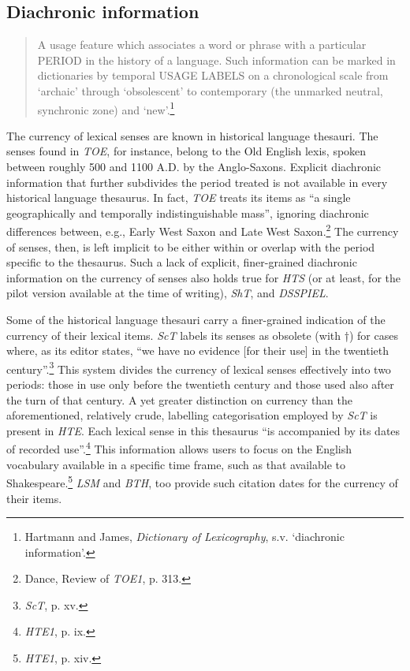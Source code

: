 \subsection*{Diachronic information}
\begin{quotation} \noindent
A usage feature which associates a word or phrase with a particular PERIOD in the history of a language. Such information can be marked in dictionaries by temporal USAGE LABELS on a chronological scale from `archaic' through `obsolescent' to contemporary (the unmarked neutral, synchronic zone) and `new'.\footnote{Hartmann and James, \textit{Dictionary of Lexicography}, s.v. `diachronic information'.}
\end{quotation}
The currency of lexical senses are known in historical language thesauri. The senses found in \textit{TOE}, for instance, belong to the Old English lexis, spoken between roughly 500 and 1100 A.D. by the Anglo-Saxons. Explicit diachronic information that further subdivides the period treated is not available in every historical language thesaurus. In fact, \textit{TOE} treats its items as ``a single geographically and temporally indistinguishable mass'', ignoring diachronic differences between, e.g., Early West Saxon and Late West Saxon.\footnote{Dance, Review of \textit{TOE1}, p. 313.} 
The currency of senses, then, is left implicit to be either within or overlap with the period specific to the thesaurus. Such a lack of explicit, finer-grained diachronic information on the currency of senses also holds true for \textit{HTS} (or at least, for the pilot version available at the time of writing), \textit{ShT}, and \textit{DSSPIEL}.

Some of the historical language thesauri carry a finer-grained indication of the currency of their lexical items. \textit{ScT} labels its senses as obsolete (with †) for cases where, as its editor states, ``we have no evidence [for their use] in the twentieth century''.\footnote{\textit{ScT}, p. xv.} This system divides the currency of lexical senses effectively into two periods: those in use only before the twentieth century and those used also after the turn of that century. A yet greater distinction on currency than the aforementioned, relatively crude, labelling categorisation employed by \textit{ScT} is present in \textit{HTE}. Each lexical sense in this thesaurus ``is accompanied by its dates of recorded use''.\footnote{\textit{HTE1}, p. ix.} This information allows users to focus on the English vocabulary available in a specific time frame, such as that available to Shakespeare.\footnote{%
\textit{HTE1}, p. xiv.} \textit{LSM} and \textit{BTH}, too provide such citation dates for the currency of their items. %


